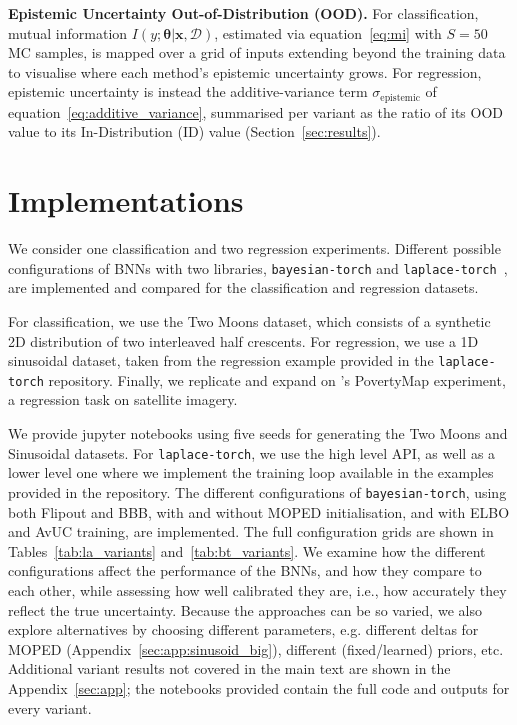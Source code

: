 \documentclass[conference]{IEEEtran}
\newcommand{\btheta}{\bm{\theta}}
\newcommand{\cD}{\mathcal{D}}
\begin{document}
\textbf{Epistemic Uncertainty Out-of-Distribution (OOD).} For classification, mutual
information $I(y;\btheta|\bm{x},\cD)$, estimated via equation~\eqref{eq:mi} with $S=50$ MC
samples, is mapped over a grid of inputs extending beyond the training data to visualise
where each method's epistemic uncertainty grows. For regression, epistemic uncertainty is
instead the additive-variance term $\sigma_{\text{epistemic}}$ of
equation~\eqref{eq:additive_variance}, summarised per variant as the ratio of its OOD value
to its In-Distribution (ID) value (Section~\ref{sec:results}).

\section{Implementations}
\label{sec:imp}

We consider one classification and two regression experiments. Different possible
configurations of BNNs with two libraries,
\texttt{bayesian-torch} and
\texttt{laplace-torch}~\citep{daxberger2021laplace}, are implemented
and compared for the classification and regression datasets.

For classification, we use the Two Moons dataset, which consists of a synthetic 2D
distribution of two interleaved half crescents. For regression, we use a 1D sinusoidal
dataset, taken from the regression example provided in the
\texttt{laplace-torch} repository. Finally, we replicate and
expand on \citet{daxberger2021laplace}'s PovertyMap experiment, a regression task on
satellite imagery.

We provide jupyter notebooks using five seeds for generating the Two Moons and Sinusoidal
datasets. For \texttt{laplace-torch}, we use the high level API, as well as a lower level
one where we implement the training loop available in the examples provided in the
repository. The different configurations of \texttt{bayesian-torch}, using both Flipout and
BBB, with and without MOPED initialisation, and with ELBO and AvUC training, are
implemented. The full configuration grids are shown in Tables~\ref{tab:la_variants}
and~\ref{tab:bt_variants}. We examine how the different configurations affect the
performance of the BNNs, and how they compare to each other, while assessing how well
calibrated they are, i.e., how accurately they reflect the true uncertainty. Because the
approaches can be so varied, we also explore alternatives by choosing different parameters,
e.g. different deltas for MOPED (Appendix~\ref{sec:app:sinusoid_big}), different
(fixed/learned) priors, etc. Additional variant results not covered in the main text are
shown in the Appendix~\ref{sec:app}; the notebooks provided contain the full code and
outputs for every variant.
\end{document}
